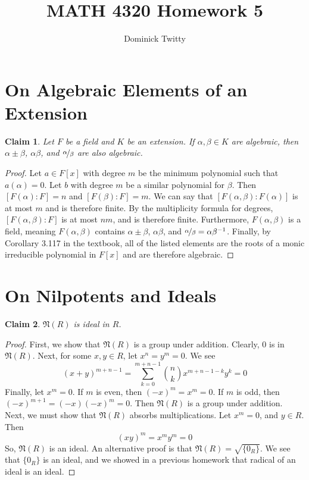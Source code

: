 \documentclass[12pt]{article}
\newtheorem*{claim*}{Claim}
\newcommand*{\nil}{\mathfrak{N}}
\newcommand*{\inv}{^{-1}}
\begin{document}
\title{MATH 4320 Homework 5}
\author{Dominick Twitty}
\date{}
\maketitle

\section{On Algebraic Elements of an Extension}
\begin{claim*}
Let $F$ be a field and $K$ be an extension. If $\alpha, \beta \in K$ are algebraic, then $\alpha \pm \beta$, $\alpha \beta$, and $\nicefrac{\alpha}{\beta}$ are also algebraic.
\end{claim*}
\begin{proof}
Let $a \in F[x]$ with degree $m$ be the minimum polynomial such that $a(\alpha) = 0$. Let $b$ with degree $m$ be a similar polynomial for $\beta$. Then $[F(\alpha) : F] = n$ and $[F(\beta) : F] = m$. We can say that $[F(\alpha, \beta) : F(\alpha)]$ is at most $m$ and is therefore finite. By the multiplicity formula for degrees, $[F(\alpha,\beta) : F]$ is at most $nm$, and is therefore finite. Furthermore, $F(\alpha, \beta)$ is a field, meaning $F(\alpha, \beta)$ contains $\alpha \pm \beta$, $\alpha \beta$, and $\nicefrac{\alpha}{\beta} = \alpha \beta\inv$. Finally, by Corollary 3.117 in the textbook, all of the listed elements are the roots of a monic irreducible polynomial in $F[x]$ and are therefore algebraic.
\end{proof}



\section{On Nilpotents and Ideals}
\begin{claim*}
$\nil(R)$ is ideal in $R$.
\end{claim*}
\begin{proof}
First, we show that $\nil(R)$ is a group under addition. Clearly, $0$ is in $\nil(R)$. Next, for some $x,y \in R$, let $x^n = y^m = 0$. We see
\[ (x + y) ^ {m + n - 1} = \sum_{k = 0}^{m + n - 1} \binom{n}{k} x^{m + n - 1 - k} y^k = 0\]
Finally, let $x ^ m = 0$. If $m$ is even, then $(-x) ^ m = x ^ m = 0$. If $m$ is odd, then $(-x) ^ {m + 1} = (-x)(-x)^m = 0$. Then $\nil(R)$ is a group under addition. Next, we must show that $\nil(R)$ absorbs multiplications. Let $x^m = 0$, and $y \in R$. Then
\[ (xy) ^ m = x^m y^m = 0 \]
So, $\nil(R)$ is an ideal. An alternative proof is that $\nil(R) = \sqrt{\{0_R\}}$. We see that $\{0_R\}$ is an ideal, and we showed in a previous homework that radical of an ideal is an ideal.
\end{proof}
\end{document}
